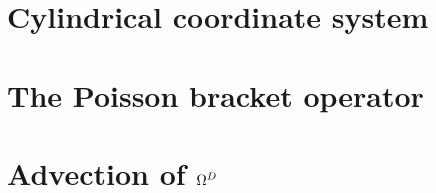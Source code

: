\documentclass[12pt,a4paper,oneside,openright]{report} %
\begin{document}
\chapter{Cylindrical coordinate system}
\label{app:cylcoord}


\chapter{The Poisson bracket operator}
\label{app:poisson}


\chapter{Advection of \texorpdfstring{$\Omega^D$}{OmegaD}}
\label{app:vortDAdv}




\end{document}
